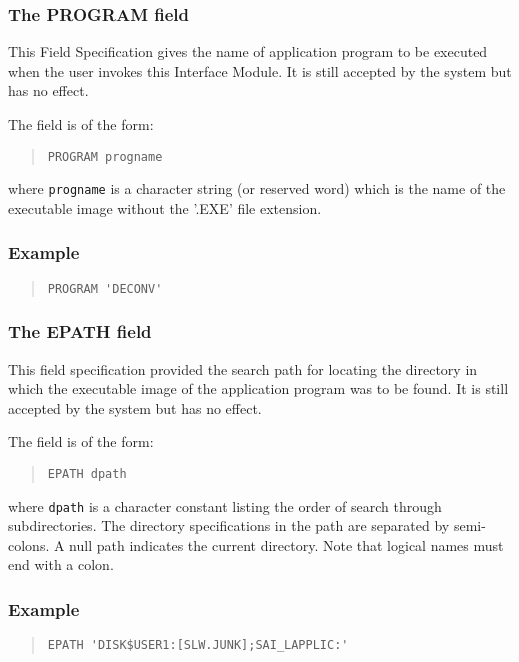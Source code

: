 \documentclass[twoside,11pt]{article}
\renewcommand{\_}{\texttt{\symbol{95}}}
\begin{document}
\subsubsection{The PROGRAM field}
This Field Specification gives the name of application program to be executed
when the user invokes this Interface Module.
It is still accepted by the system but has no effect.

The field is of the form:
\begin{quote} \begin{verbatim}
PROGRAM progname
\end{verbatim} \end{quote}
where \texttt{progname} is a character string (or reserved word) which is
the name of the executable image without the '.EXE' file extension.

\subsubsection*{Example}
\begin{quote} \begin{verbatim}
PROGRAM 'DECONV'
\end{verbatim} \end{quote}

\subsubsection{The EPATH field}
This field specification provided the search path for locating the
directory in which the executable image of the application program was to be 
found.
It is still accepted by the system but has no effect.

The field is of the form:
\begin{quote} \begin{verbatim}
EPATH dpath
\end{verbatim} \end{quote}
where \texttt{dpath} is a character constant listing the order of search through
subdirectories. The directory specifications in the path are separated
by semi-colons. A null path indicates the current directory. Note that
logical names must end with a colon. 

\subsubsection*{Example}
\begin{quote} \begin{verbatim}
EPATH 'DISK$USER1:[SLW.JUNK];SAI_LAPPLIC:'
\end{verbatim} \end{quote}
\end{document}
